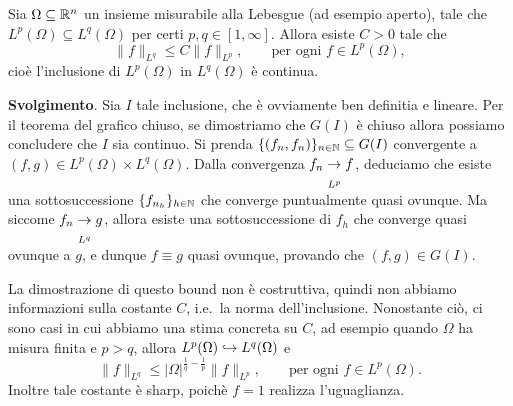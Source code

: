 	\begin{exercise}
	Sia $\Omega \subseteq \mathbb{R}^n$ un insieme misurabile alla Lebesgue (ad esempio aperto), tale che $L^p(\Omega) \subseteq L^q(\Omega)$ per certi $p,q \in [1, \infty]$.
	Allora esiste $C > 0$ tale che
	\begin{equation*}
		\|f\|_{L^q} \leq C\|f\|_{L^p}, \qquad \text{per ogni $f \in L^p(\Omega)$},
	\end{equation*}
	cioè l'inclusione di $L^p(\Omega)$ in $L^q(\Omega)$ è continua.

	\textbf{Svolgimento}. Sia $I$ tale inclusione, che è ovviamente ben definitia e lineare. Per il teorema del grafico chiuso, se dimostriamo che $G(I)$ è chiuso allora possiamo concludere che $I$ sia continuo.
	Si prenda $\{(f_n, f_n)\}_{n \in \mathbb{N}} \subseteq G(I)$ convergente a $(f,g) \in L^p(\Omega) \times L^q(\Omega)$. Dalla convergenza $f_n \underset{L^p}\conv f$, deduciamo che esiste una sottosuccessione $\{f_{n_h}\}_{h \in \mathbb{N}}$ che converge puntualmente quasi ovunque. Ma siccome $f_n \underset{L^q}\conv g$, allora esiste una sottosuccessione di $f_h$ che converge quasi ovunque a $g$, e dunque $f \equiv g$ quasi ovunque, provando che $(f,g) \in G(I)$.
\end{exercise}

\begin{remark}
	La dimostrazione di questo bound non è costruttiva, quindi non abbiamo informazioni sulla costante $C$, i.e.\ la norma dell'inclusione. Nonostante ciò, ci sono casi in cui abbiamo una stima concreta su $C$, ad esempio quando $\Omega$ ha misura finita e $p > q$, allora $L^p(\Omega) \hookrightarrow L^q(\Omega)$ e
	\begin{equation*}
		\|f\|_{L^q} \leq |\Omega|^{\frac1q - \frac1p}\|f\|_{L^p}, \qquad \text{per ogni $f \in L^p(\Omega)$}.
	\end{equation*}
	Inoltre tale costante è sharp, poichè $f=1$ realizza l'uguaglianza.
\end{remark}

